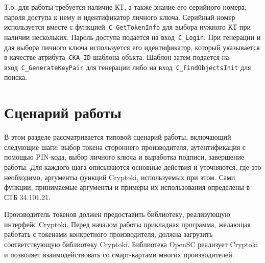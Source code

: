 

Т.о. для работы требуется наличие КТ, а также знание его
серийного номера, пароля доступа к нему и идентификатор личного ключа.
Серийный номер используется вместе с функцией~\verb|C_GetTokenInfo|
для выбора нужного КТ при наличии нескольких.
Пароль доступа подается на вход~\verb|C_Login|.
При генерации и для выбора личного ключа
используется его идентификатор, который указывается
в качестве атрибута~\verb|CKA_ID| шаблона объкта.
Шаблон затем подается на вход~\verb|C_GenerateKeyPair|
для генерации либо на вход~\verb|C_FindObjectsInit| для
поиска.
\fi

\section{Сценарий работы}

В этом разделе рассматривается типовой сценарий работы,
включающий следующие шаги: выбор токена стороннего
производителя, аутентификация с помощью PIN-кода, выбор
личного ключа и выработка подписи, завершение работы.
Для каждого шага описываются основные действия и
уточняются, где это необходимо, аргументы функций Cryptoki,
используемых при этом.
Сами функции, принимаемые аргументы и примеры
их использования определены в СТБ 34.101.21.

Производитель токенов должен предоставить библиотеку,
реализующую интерфейс Cryptoki. Перед началом работы прикладная
программа, желающая работать с токенами конкретного
производителя, должна загрузить соответствующую библиотеку
Cryptoki. Библиотека OpenSC реализует Cryptoki и позволяет
взаимодействовать со смарт-картами многих производителей.

